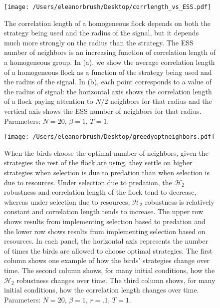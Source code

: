 \documentclass{article}
\begin{document}
\begin{figure}
\texttt{[image: /Users/eleanorbrush/Desktop/corrlength\_vs\_ESS.pdf]}
\caption{\label{corrESS}
The correlation length of a homogeneous flock depends on both the strategy being used and the radius of the signal, but it depends much more strongly on the radius than the strategy. The ESS number of neighbors is an increasing function of correlation length of a homogeneous group. In (a), we show the average correlation length of a homogeneous flock as a function of the strategy being used and the radius of the signal. In (b), each point corresponds to a value of the radius of signal: the horizontal axis shows the correlation length of a flock paying attention to $N/2$ neighbors for that radius and the vertical axis shows the ESS number of neighbors for that radius. Parameters: $N=20$, $\beta=1$, $T=1$.
}
\end{figure}

\begin{figure}
\texttt{[image: /Users/eleanorbrush/Desktop/greedyoptneighbors.pdf]}
\caption{\label{greedyopt} When the birds choose the optimal number of neighbors, given the strategies the rest of the flock are using, they settle on higher strategies when selection is due to predation than when selection is due to resources. Under selection due to predation, the $\mathscr{H}_2$ robustness and correlation length of the flock tend to decrease, whereas under selection due to resources, $\mathscr{H}_2$ robustness is relatively constant and correlation length tends to increase. The upper row shows results from implementing selection based to predation and the lower row shows results from implementing selection based on resources. In each panel, the  horizontal axis represents the number of times the birds are allowed to choose optimal strategies. The first column shows one example of how the birds' strategies change over time. The second column shows, for many initial conditions, how the $\mathscr{H}_2$ robustness changes over time. The third column shows, for many initial conditions, how the correlation length changes over time. Parameters:  $N=20$, $\beta=1$, $r=.1$, $T=1$. 
}
\end{figure}


\nocite{*}


\end{document}
